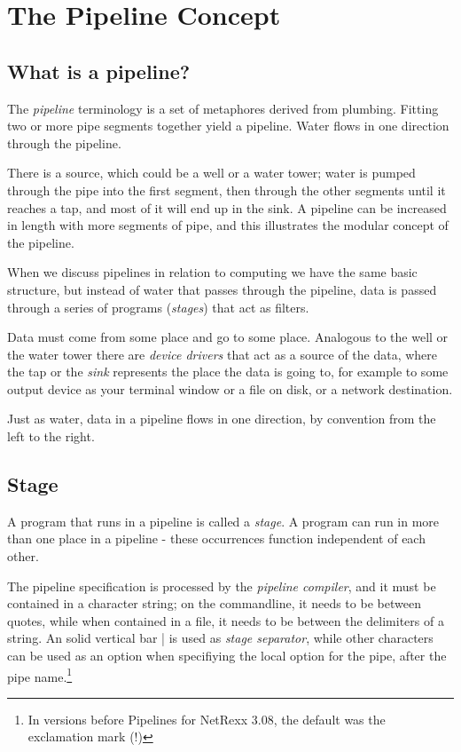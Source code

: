 \chapter{The Pipeline Concept}
\section{What is a pipeline?}
The \emph{pipeline} terminology is a set of metaphores derived from
plumbing. Fitting two or more pipe segments together yield a
pipeline. Water flows in one direction through the pipeline.

There is a source, which could be a well or a water tower; water is
pumped through the pipe into the first segment, then through the other
segments until it reaches a tap, and most of it will end up in the
sink. A pipeline can be increased in length with more segments of
pipe, and this illustrates the modular concept of the pipeline.

When we discuss pipelines in relation to computing we have the same
basic structure, but instead of water that passes through the
pipeline, data is passed through a series of programs (\emph{stages})
that act as filters.

Data must come from some place and go to some place. Analogous to the
well or the water tower there are \emph{device drivers} that act as a
source of the data, where the tap or the \emph{sink} represents the place the
data is going to, for example to some output device as your terminal
window or a file on disk, or a network destination.

Just as water, data in a pipeline flows in one direction, by
convention from the left to the right.
\section{Stage}
A program that runs in a pipeline is called a \emph{stage}. A program
can run in more than one place in a pipeline - these occurrences
function independent of each other. 

The pipeline specification is processed by the \emph{pipeline
  compiler}, and it must be contained in a character string; on the
commandline, it needs to be between quotes, while when contained in a
file, it needs to be between the delimiters of a \nr{} string. An
solid vertical bar | is used as \emph{stage separator}, while other characters
can be used as an option when specifiying the
local option for the pipe, after the pipe name.\footnote{In versions
  before Pipelines for NetRexx 3.08, the default was the exclamation mark (!)}

